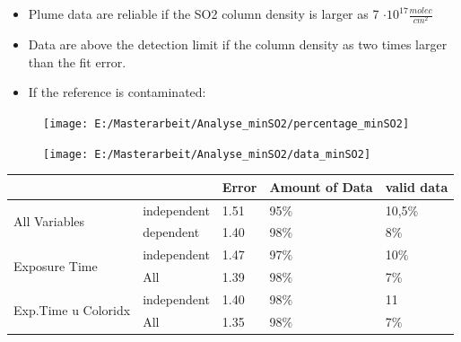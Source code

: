 \documentclass  [
  paper    = a4,
  BCOR     = 10mm,
  twoside,
  fontsize = 12pt,
  fleqn,
  toc      = bibnumbered,
  toc      = listofnumbered,
  numbers  = noendperiod,
  headings = normal,
  listof   = leveldown,
  version  = 3.03
]                                       {scrreprt}
\begin{document}
	\begin{itemize}
	
		\item Plume data are reliable if the SO2 column density is larger as 7 $\cdot 10^{17} \frac{molec}{cm^2}$
		\item Data are above the detection limit if the column density as two times larger than the fit error.
		\item If the reference is contaminated:

	\end{itemize}
	\begin{figure}
		\centering
		\texttt{[image: E:/Masterarbeit/Analyse\_minSO2/percentage\_minSO2]}
		\caption{}
		\label{fig:percentageminso2}
	\end{figure}
	\begin{figure}
		\centering
		\texttt{[image: E:/Masterarbeit/Analyse\_minSO2/data\_minSO2]}
		\caption{}
		\label{fig:dataminso2}
	\end{figure}
			\begin{table}[h]
		\begin{tabular}{|p{2cm}|p{2.5cm}|p{1.5cm}|p{1.5cm}||p{1cm}|}
			&& Error & Amount of Data&valid data\\
			\toprule
			\multirow{2}{5em}{All Variables} 
			& independent& 1.51 & 95$\%$&10,5$\%$\\
			& dependent & 1.40&98$\%$ &8$\%$\\
			\midrule
			\multirow{2}{5em}{Exposure Time}
			&  independent &1.47&97$\%$&10$\%$\\
			& All &1.39&98$\%$&7$\%$\\
			\midrule
			\multirow{2}{5em}{Exp.Time u Coloridx}
			&  independent &1.40& 98$\%$&11\\
			& All & 1.35& 98$\%$&7$\%$\\
			\bottomrule
		\end{tabular}
	\end{table}
\end{document}
